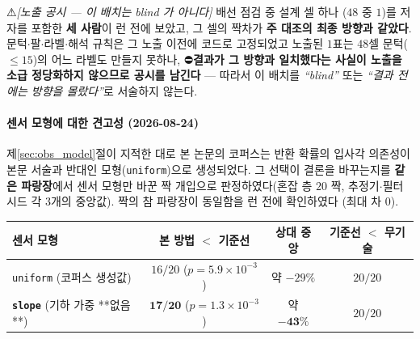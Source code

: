 \documentclass[11pt]{report}
\numberwithin{equation}{chapter}
\numberwithin{figure}{chapter}
\numberwithin{table}{chapter}
\begin{document}
⚠\emph{[노출 공시 --- 이 배치는 blind 가 아니다]} 배선 점검 중 설계 셀 하나
($48$ 중 $1$)를 저자를 포함한 \textbf{세 사람}이 런 전에 보았고, 그 셀의 짝차가
\textbf{주 대조의 최종 방향과 같았다}. 문턱$\cdot$팔$\cdot$라벨$\cdot$해석 규칙은 그
노출 이전에 코드로 고정되었고 노출된 $1$표는 $48$셀 문턱($\le 15$)의 어느 라벨도
만들지 못하나, ⛔\textbf{결과가 그 방향과 일치했다는 사실이 노출을 소급 정당화하지
않으므로 공시를 남긴다} --- 따라서 이 배치를 \emph{``blind''} 또는 \emph{``결과 전에는
방향을 몰랐다''}로 서술하지 않는다.

\paragraph{센서 모형에 대한 견고성 (2026-08-24)}
제\ref{sec:obs_model}절이 지적한 대로 본 논문의 코퍼스는 반환 확률의 입사각 의존성이
본문 서술과 반대인 모형(\texttt{uniform})으로 생성되었다. 그 선택이 결론을 바꾸는지를
\textbf{같은 파랑장}에서 센서 모형만 바꾼 짝 개입으로 판정하였다(혼잡 층 $20$ 짝,
추정기$\cdot$필터 시드 각 $3$개의 중앙값). 짝의 참 파랑장이 동일함을 런 전에 확인하였다
(최대 차 $0$).

\begin{center}
\begin{tabular}{lccc}
\toprule
센서 모형 & 본 방법 $<$ 기준선 & 상대 중앙 & 기준선 $<$ 무기술 \\
\midrule
\texttt{uniform} (코퍼스 생성값) & $16/20$ ($p=5.9\times10^{-3}$) & 약 $-29\%$ & $20/20$ \\
\textbf{\texttt{slope}} (기하 가중 **없음**) & $\mathbf{17/20}$ ($p=1.3\times10^{-3}$) & 약 $\mathbf{-43\%}$ & $20/20$ \\
\bottomrule
\end{tabular}
\end{center}
\end{document}
